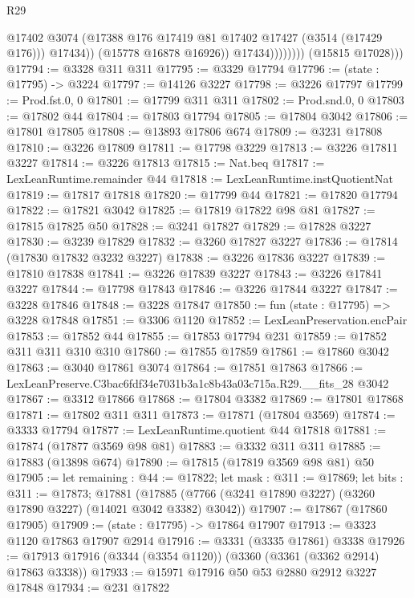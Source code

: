 \begin{lexlean}{R29}
\begin{coremodule}
                              @17402
                              @3074
                              (@17388 @176 @17419 @81 @17402 @17427 (@3514 (@17429 @176)))
                              @17434))
                          (@15778 @16878 @16926))
                        @17434))))))))
        (@15815 @17028)))
@17794 := @3328 @311 @311
@17795 := @3329 @17794
@17796 := (state : @17795) -> @3224
@17797 := @14126 @3227
@17798 := @3226 @17797
@17799 := Prod.fst.{0, 0}
@17801 := @17799 @311 @311
@17802 := Prod.snd.{0, 0}
@17803 := @17802 @44
@17804 := @17803 @17794
@17805 := @17804 @3042
@17806 := @17801 @17805
@17808 := @13893 @17806 @674
@17809 := @3231 @17808
@17810 := @3226 @17809
@17811 := @17798 @3229
@17813 := @3226 @17811 @3227
@17814 := @3226 @17813
@17815 := Nat.beq
@17817 := LexLeanRuntime.remainder @44
@17818 := LexLeanRuntime.instQuotientNat
@17819 := @17817 @17818
@17820 := @17799 @44
@17821 := @17820 @17794
@17822 := @17821 @3042
@17825 := @17819 @17822 @98 @81
@17827 := @17815 @17825 @50
@17828 := @3241 @17827
@17829 := @17828 @3227
@17830 := @3239 @17829
@17832 := @3260 @17827 @3227
@17836 := @17814 (@17830 @17832 @3232 @3227)
@17838 := @3226 @17836 @3227
@17839 := @17810 @17838
@17841 := @3226 @17839 @3227
@17843 := @3226 @17841 @3227
@17844 := @17798 @17843
@17846 := @3226 @17844 @3227
@17847 := @3228 @17846
@17848 := @3228 @17847
@17850 := fun (state : @17795) => @3228 @17848
@17851 := @3306 @1120
@17852 := LexLeanPreservation.encPair
@17853 := @17852 @44
@17855 := @17853 @17794 @231
@17859 := @17852 @311 @311 @310 @310
@17860 := @17855 @17859
@17861 := @17860 @3042
@17863 := @3040 @17861 @3074
@17864 := @17851 @17863
@17866 := LexLeanPreserve.C3bac6fdf34e7031b3a1c8b43a03c715a.R29.__fits_28 @3042
@17867 := @3312 @17866
@17868 := @17804 @3382
@17869 := @17801 @17868
@17871 := @17802 @311 @311
@17873 := @17871 (@17804 @3569)
@17874 := @3333 @17794
@17877 := LexLeanRuntime.quotient @44 @17818
@17881 := @17874 (@17877 @3569 @98 @81)
@17883 := @3332 @311 @311
@17885 := @17883 (@13898 @674)
@17890 := @17815 (@17819 @3569 @98 @81) @50
@17905 := let remaining : @44 := @17822;
  let mask : @311 := @17869;
  let bits : @311 := @17873;
  @17881 (@17885 (@7766 (@3241 @17890 @3227) (@3260 @17890 @3227) (@14021 @3042 @3382) @3042))
@17907 := @17867 (@17860 @17905)
@17909 := (state : @17795) -> @17864 @17907
@17913 := @3323 @1120 @17863 @17907 @2914
@17916 := @3331 (@3335 @17861) @3338
@17926 := @17913 @17916 (@3344 (@3354 @1120)) (@3360 (@3361 (@3362 @2914) @17863 @3338))
@17933 := @15971 @17916 @50 @53 @2880 @2912 @3227 @17848
@17934 := @231 @17822

\end{coremodule}
\end{lexlean}
